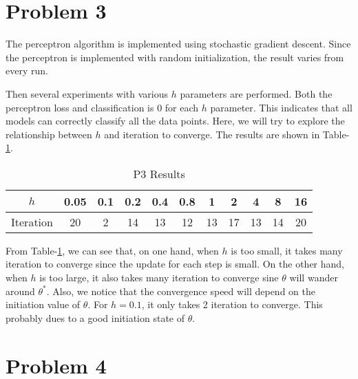 \documentclass[12pt]{article}
\begin{document}
\section{Problem 3}

The perceptron algorithm is implemented using stochastic gradient descent. Since the perceptron is implemented with random initialization, the result varies from every run. 

Then several experiments with various $h$ parameters are performed. Both the perceptron loss and classification is 0 for each $h$ parameter. This indicates that all models can correctly classify all the data points. Here, we will try to explore the relationship between $h$ and iteration to converge. The results are shown in Table-\ref{tab:p3_cov}.

\begin{table}[ht!]
  \begin{center}
    \begin{tabular}{|c|c|c|c|c|c|c|c|c|c|c|}
      \hline
      $h$	  & 0.05 & 0.1 & 0.2 & 0.4 & 0.8 & 1  & 2  &  4
      	          &   8  &  16 \\ \hline
      Iteration   &  20  &  2  & 14  & 13  & 12  & 13 & 17 & 13
      		  &  14  &  20 \\ \hline
    \end{tabular}
  \end{center}
  \caption{P3 Results\label{tab:p3_cov}}
\end{table}

From Table-\ref{tab:p3_cov}, we can see that, on one hand, when $h$ is too small, it takes many iteration to converge since the update for each step is small. On the other hand, when $h$ is too large, it also takes many iteration to converge sine $\theta$ will wander around $\theta^*$. Also, we notice that the convergence speed will depend on the initiation value of $\theta$. For $h = 0.1$, it only takes 2 iteration to converge. This probably dues to a good initiation state of $\theta$.

\section{Problem 4}
\end{document}
